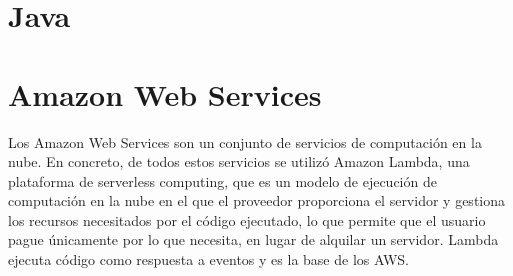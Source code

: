 \section{Java}

\section{Amazon Web Services}

Los Amazon Web Services son un conjunto de servicios de computación en la nube. En concreto, de todos estos servicios se utilizó Amazon Lambda, una plataforma de serverless computing, que es un modelo de ejecución de computación en la nube en el que el proveedor proporciona el servidor y gestiona los recursos necesitados por el código ejecutado, lo que permite que el usuario pague únicamente por lo que necesita, en lugar de alquilar un servidor. Lambda ejecuta código como respuesta a eventos y es la base de los AWS.

